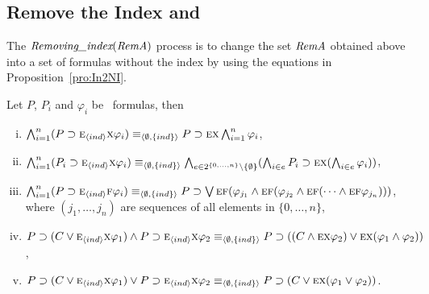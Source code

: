 \documentclass{article}
\begin{document}
\subsection{Remove the Index and \start}
The $\emph{Removing\_index}(\emph{RemA})$ process is to change the set $\emph{RemA}$ obtained above into a set of formulas without the index by using the equations in Proposition~\ref{pro:In2NI}.
\begin{proposition}\label{pro:In2NI}
Let $P$, $P_i$ and $\varphi_i$ be \CTL\ formulas, then
\begin{enumerate}[(i)]
  \item $\bigwedge_{i=1}^n (P\supset \textsc{e}_{{\langle{ind}\rangle}} \textsc{x} \varphi_i)  \equiv_{{\langle{\emptyset, \{ind\}}\rangle}} P\supset \textsc{e} \textsc{x} \bigwedge_{i=1}^n \varphi_i$,
  \item $\bigwedge_{i=1}^n (P_i\supset \textsc{e}_{{\langle{ind}\rangle}} \textsc{x} \varphi_i) \equiv_{{\langle{\emptyset, \{ind\}}\rangle}} \bigwedge_{e \in 2^{\{0,\dots, n\}} \setminus \{\emptyset\}}(\bigwedge_{i\in e}P_i\supset \textsc{e} \textsc{x} (\bigwedge_{i\in e}\varphi_i))$,
  \item $\bigwedge_{i=1}^n (P\supset \textsc{e}_{{\langle{ind}\rangle}} \textsc{f} \varphi_i)  \equiv_{{\langle{\emptyset, \{ind\}}\rangle}} P\supset \bigvee\textsc{e}\textsc{f} (\varphi_{j_1} \wedge \textsc{e}\textsc{f}(\varphi_{j_2} \wedge \textsc{e}\textsc{f}(\dots \wedge \textsc{e}\textsc{f} \varphi_{j_n})))$, where $(j_1, \dots, j_n)$ are sequences of all elements in $\{0, \dots, n\}$,
  \item $P\supset (C \vee \textsc{e}_{{\langle{ind}\rangle}} \textsc{x} \varphi_1) \wedge P \supset \textsc{e}_{{\langle{ind}\rangle}} \textsc{x} \varphi_2 \equiv_{{\langle{\emptyset, \{ind\}}\rangle}} P \supset ((C \wedge \textsc{e} \textsc{x} \varphi_2) \vee \textsc{e} \textsc{x} (\varphi_1 \wedge \varphi_2))$,
  \item $P\supset (C \vee \textsc{e}_{{\langle{ind}\rangle}} \textsc{x} \varphi_1) \vee P \supset \textsc{e}_{{\langle{ind}\rangle}} \textsc{x} \varphi_2 \equiv_{{\langle{\emptyset, \{ind\}}\rangle}} P \supset (C \vee \textsc{e} \textsc{x} (\varphi_1 \vee \varphi_2))$.
\end{enumerate}
\end{proposition}
\end{document}
